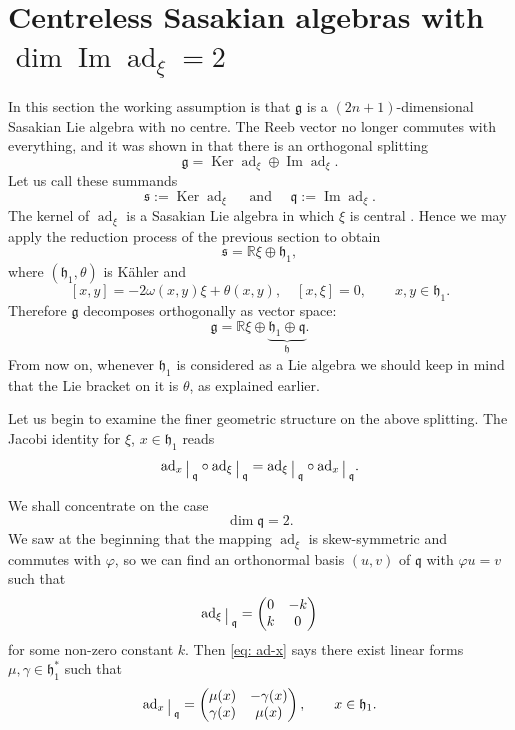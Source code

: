 \documentclass[12pt, twoside]{amsart}
\def\g{\mathfrak{g}}
\def\h{\mathfrak{h}}
\def\q{\mathfrak{q}}
\def\s{\mathfrak s}
\def\R{\mathbb{R}}
\def\ad{\operatorname{ad}}
\renewcommand{\Im}{\operatorname{Im}}
\def\Ker{\operatorname{Ker}}
\newcommand{\restr}{\raisebox{-.2em}{$\!\big\arrowvert$}}
\theoremstyle{definition}
\begin{document}
\bigbreak

\section[Centreless Sasakian algebras with $\dim \Im \ad_{\xi}=2$]{Centreless Sasakian algebras  with \texorpdfstring{$\dim \Im  \ad_{\xi}=2$}{}}\label{sec:centreless}

In this section the working assumption is that $\g$ is a $(2n+1)$-dimensional Sasakian Lie algebra with no centre. The Reeb vector no longer commutes with everything, and it was shown in \cite[Corollary 3.12]{AFV} that there is an orthogonal splitting
  \[\mathfrak{g}= \Ker\ad_{\xi} \oplus  \Im \ad_{\xi}.\]
  Let us call these summands 
  $$\s:= \Ker \ad_{\xi}\quad \text{ and }\quad \q:=\Im  \ad_{\xi}.$$  
The kernel of $\ad_{\xi}$ is a Sasakian Lie algebra in which $\xi$ is central \cite[Proposition 3.13]{AFV}. Hence we may apply the reduction process of the previous section to obtain
$$\s= \R \xi \oplus \h_{1},$$ 
where  $(\h_{1}, \theta)$  is K{\"a}hler and 
\begin{equation}\label{eq: h1-bracket}
 [x,y]=-2\omega(x,y)\xi + \theta(x,y), \quad [x,\xi]=0, \qquad x,y \in \h_1.
\end{equation} 
Therefore $\g$ decomposes orthogonally as vector space: 
\begin{equation}\label{eq:g=xi+h1+w}
\mathfrak{g}= \mathbb{R} \xi \oplus \underbrace{\h_{1} \oplus \q}_{\h}.
\end{equation}
From now on, whenever $\h_1$ is considered as a Lie algebra we should keep in mind that the Lie bracket on it is $\theta$, as explained earlier.

Let us begin to examine the finer geometric structure on the above splitting. 
The Jacobi identity for $\xi$, $x \in \h_1$  reads 
\begin{equation}\label{eq: ad-x}
\ad_{x}\restr_{{\q}} \circ \ad_{\xi}\restr_{\q} = \ad_{\xi}\restr_{\q} \circ \ad_x\restr_{\q}.
\end{equation}

\medskip

We shall concentrate on the case 
$$\dim \q=2.$$
We saw at the beginning that the mapping $\ad_{\xi}$ is skew-symmetric and commutes with $\varphi$, so we can find an orthonormal basis $(u,v)$ of ${\q}$ with  $\varphi u=v$ such that 
\begin{equation}\label{eq:ad_xi w}
\ad_{\xi}\restr_{\q}=
\begin{pmatrix} 0 & -k \\ k & 0 \end{pmatrix}
\end{equation}
for some non-zero constant $k$. Then \eqref{eq: ad-x} says there exist linear forms $\mu, \gamma \in \h_{1}^*$ such that 
\begin{equation}\label{eq:ad_x w}
\ad_{x}\restr_{\q}=
\begin{pmatrix} \mu(x) & -\gamma(x) \\ \gamma(x) & \mu(x)
\end{pmatrix},\qquad x\in \h_1.
\end{equation}
\end{document}

